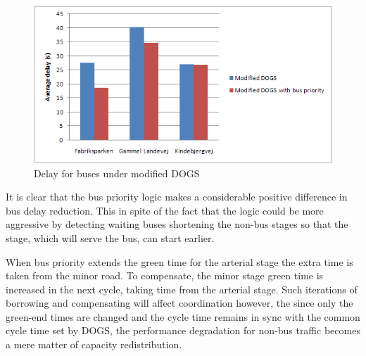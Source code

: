 \begin{figure}[ht]
\centering
\includegraphics[scale=0.30]{delay_bus_modified-dogs.png}
\caption{Delay for buses under modified DOGS}
\label{fig:delay_bus_modified_dogs}
\end{figure}

It is clear that the bus priority logic makes a considerable positive difference in bus delay reduction. This in spite of the fact that the logic could be more aggressive by detecting waiting buses shortening the non-bus stages so that the stage, which will serve the bus, can start earlier.

When bus priority extends the green time for the arterial stage the extra time is taken from the minor road. To compensate, the minor stage green time is increased in the next cycle, taking time from the arterial stage. Such iterations of borrowing and compensating will affect coordination however, the since only the green-end times are changed and the cycle time remains in sync with the common cycle time set by DOGS, the performance degradation for non-bus traffic becomes a mere matter of capacity redistribution.